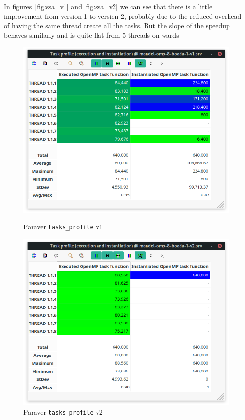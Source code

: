 In figures~\ref{fig:ssa_v1} and \ref{fig:ssa_v2} we can see that there is a little improvement
from version 1 to version 2, probably due to the reduced overhead of having the same thread create all the
tasks. But the slope of the speedup behaves similarly and is quite flat from 5 threads on-wards.

\pagebreak

\begin{figure}[H]
    \begin{minipage}{0.5\textwidth}
        \centering
        \includegraphics[width=0.7\linewidth]{captures/paraver_tasks_v1.png}
        \caption{Paraver \texttt{tasks\_profile} v1}
        \label{fig:profile_v1} 
    \end{minipage}
    \begin{minipage}{0.5\textwidth}
        \centering
        \includegraphics[width=0.7\linewidth]{captures/paraver_tasks_v2.png}
        \caption{Paraver \texttt{tasks\_profile} v2}
        \label{fig:profile_v2} 
    \end{minipage}
\end{figure}

